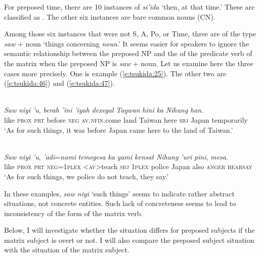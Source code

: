 \documentclass[output=paper
,modfonts
,nonflat]{langsci/langscibook}
\begin{document}
For preposed time, there are 10 instances of \textit{si'ida} ‘then, at that time.’ These are classified as . The other six instances are bare common nouns (CN). 

Among those six instances that were not S, A, Po, or Time, three are of the type \textit{saw} + noun ‘things concerning \textit{noun}.’ It seems easier for speakers to ignore the semantic relationship between the preposed NP and the  of the predicate verb of the matrix  when the preposed NP is \textit{saw} + noun. Let us examine here the three cases more precisely. One is example (\ref{e:tsukida:25}). The other two are (\ref{e:tsukida:46}) and (\ref{e:tsukida:47}).

\begin{exe}
	\label{e:tsukida:46}\\
	\gll \textit{Saw} \textit{niyi} \textit{'u}, \textit{berah} \textit{'ini} \textit{'iyah} \textit{dexegal} \textit{Taywan}   \textit{hini}   \textit{ka}   \textit{Nihung}   \textit{han}.\\
	like \textsc{prox} \textsc{prt} before \textsc{neg} \textsc{av}.\textsc{nfin}.come  land  Taiwan  here \textsc{sbj} Japan  temporarily\\
	\glt ‘As for such things, it was before Japan came here to the land of Taiwan.’
\end{exe}

\begin{exe}
	\label{e:tsukida:47}\\
	\gll \textit{Saw}   \textit{niyi}   \textit{'u},   \textit{'adi}=\textit{nami}   \textit{t}{\USSmaller}\textit{em}{\USGreater}\textit{egesa}   \textit{ka}   \textit{yami}   \textit{kensat}   \textit{Nihung}  \textit{'uri}   \textit{pini},   \textit{mesa}.\\
	like \textsc{prox} \textsc{prt} \textsc{neg}=\textsc{1plex} <\textsc{av}>teach \textsc{sbj}  \textsc{1plex} police  Japan  also \textsc{anger}  \textsc{hearsay}\\
	\glt ‘As for such things, we  police do not teach, they say.’
\end{exe}

\noindent
In these examples, \textit{saw niyi} ‘such things’ seems to indicate rather abstract situations, not concrete entities. Such lack of concreteness seems to lead to inconsistency of the  form of the matrix verb. 

Below, I will investigate whether the situation differs for preposed subjects if the matrix subject is overt or not. I will also compare the preposed subject situation with the situation of the matrix subject.
\end{document}
